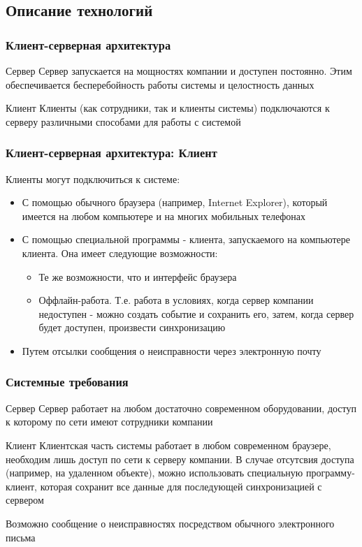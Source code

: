 \documentclass{beamer}
\begin{document}
\subsection{Описание технологий}
\begin{frame}
\frametitle{Клиент-серверная архитектура}
	\begin{block}{Сервер}
	  Сервер запускается на мощностях компании и доступен постоянно. Этим
	  обеспечивается бесперебойность работы системы и целостность данных
	\end{block}
	\begin{block}{Клиент}
	  Клиенты (как сотрудники, так и клиенты системы) подключаются к серверу
	  различными способами для работы с системой
	\end{block}
\end{frame}	
	
	
	
\begin{frame}
\frametitle{Клиент-серверная архитектура: Клиент}	
	Клиенты могут подключиться к системе:
	  \begin{itemize}
	  	\item С помощью обычного браузера (например, Internet Explorer), который
	  имеется на любом компьютере и на многих мобильных телефонах
	  	\item С помощью специальной программы - клиента, запускаемого на компьютере
	  	клиента. Она имеет следующие возможности:
	  	\begin{itemize}
	  		\item Те же возможности, что и интерфейс браузера
	  		\item Оффлайн-работа. Т.е. работа в условиях, когда сервер компании
	  		недоступен - можно создать событие и сохранить его, затем, когда сервер
	  		будет доступен, произвести синхронизацию
	  	\end{itemize}
	  	\item Путем отсылки сообщения о неисправности через электронную почту
	  \end{itemize}
\end{frame}


\begin{frame}
\frametitle{Системные требования}
	\begin{block}{Сервер}
	  Сервер работает на любом достаточно современном оборудовании, доступ к
	  которому по сети имеют сотрудники компании
	\end{block}
	\begin{block}{Клиент}
	  Клиентская часть системы работает в любом современном браузере, необходим
	  лишь доступ по сети к серверу компании. В случае отсутсвия доступа
	  (например, на удаленном объекте), можно использовать специальную
	  программу-клиент, которая сохранит все данные для последующей синхронизацией
	  с сервером
	  
	  Возможно сообщение о неисправностях посредством обычного электронного письма
	\end{block}
\end{frame}
\end{document}

